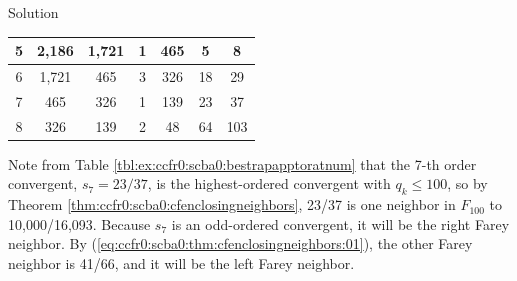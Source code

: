 \begin{vworkexampleparsection}{Solution}
\begin{table}
\begin{center}
\begin{tabular}{|c|c|c|c|c|c|c|}
\hline
\small{5}     & \small{2,186}         & \small{1,721}       & \small{1}       & \small{465}           & \small{5}        & \small{8}      \\
\hline
\small{6}     & \small{1,721}         & \small{465}         & \small{3}       & \small{326}           & \small{18}       & \small{29}     \\
\hline
\small{7}     & \small{465}           & \small{326}         & \small{1}       & \small{139}           & \small{23}       & \small{37}     \\
\hline
\small{8}     & \small{326}           & \small{139}         & \small{2}       & \small{48}            & \small{64}       & \small{103}    \\
\hline
\end{tabular}
\end{center}
\end{table}

Note from Table \ref{tbl:ex:ccfr0:scba0:bestrapapptoratnum}
that the 7-th order convergent, $s_7 = 23/37$,
is the highest-ordered convergent with $q_k \leq 100$, so 
by Theorem \ref{thm:ccfr0:scba0:cfenclosingneighbors}, 23/37
is one neighbor in $F_{100}$ to 10,000/16,093.  Because $s_7$
is an odd-ordered convergent, it will be the right
Farey neighbor.
By (\ref{eq:ccfr0:scba0:thm:cfenclosingneighbors:01}), the
other Farey neighbor is 41/66, and it will be the left
Farey neighbor.
\end{vworkexampleparsection}


